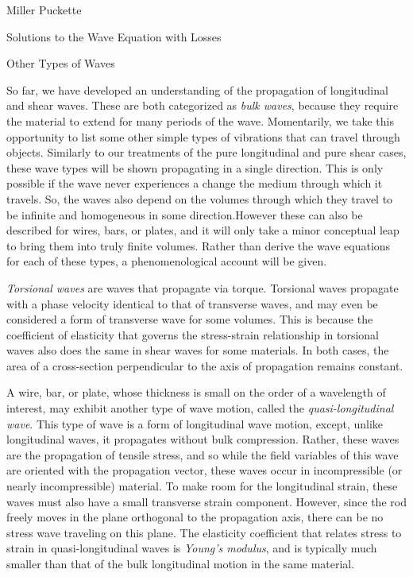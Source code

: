 \documentclass[a4paper,10pt]{report}
\numberwithin{equation}{section}
\begin{document}
\begin{chapter}{Miller Puckette}
\begin{section}{Solutions to the Wave Equation with Losses}
\end{section}
\begin{section}{Other Types of Waves}\label{sec:waves}

So far, we have developed an understanding of the propagation of longitudinal and shear waves. These are both categorized as \emph{bulk waves}, because they require the material to extend for many periods of the wave. Momentarily, we take this opportunity to list some other simple types of vibrations that can travel through objects. Similarly to our treatments of the pure longitudinal and pure shear cases, these wave types will be shown propagating in a single direction. This is only possible if the wave never experiences a change the medium through which it travels. So, the waves also depend on the volumes through which they travel to be infinite and homogeneous in some direction.However these can also be described for wires, bars, or plates, and it will only take a minor conceptual leap to bring them into truly finite volumes. Rather than derive the wave equations for each of these types, a phenomenological account will be given.

\emph{Torsional waves} are waves that propagate via torque. Torsional waves propagate with a phase velocity identical to that of transverse waves, and may even be considered a form of transverse wave for some volumes. This is because the coefficient of elasticity that governs the stress-strain relationship in torsional waves also does the same in shear waves for some materials. In both cases, the area of a cross-section perpendicular to the axis of propagation remains constant. \cite[p.~90]{Cremer1973}

A wire, bar, or plate, whose thickness is small on the order of a wavelength of interest, may exhibit another type of wave motion, called the \emph{quasi-longitudinal wave}.\cite[p.~80]{Cremer1973} This type of wave is a form of longitudinal wave motion, except, unlike longitudinal waves, it propagates without bulk compression. Rather, these waves are the propagation of tensile stress, and so while the field variables of this wave are oriented with the propagation vector, these waves occur in incompressible (or nearly incompressible) material. To make room for the longitudinal strain, these waves must also have a small transverse strain component. However, since the rod freely moves in the plane orthogonal to the propagation axis, there can be no stress wave traveling on this plane. The elasticity coefficient that relates stress to strain in quasi-longitudinal waves is \emph{Young's modulus}, and is typically much smaller than that of the bulk longitudinal motion in the same material.  \cite[p.~14]{
Kino1987}


\end{section}
\end{chapter}
\end{document}
